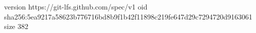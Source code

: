 version https://git-lfs.github.com/spec/v1
oid sha256:5ea9217a58623b776716bd8b9f1b42f11898c219fe647d29c7294720d9163061
size 382
